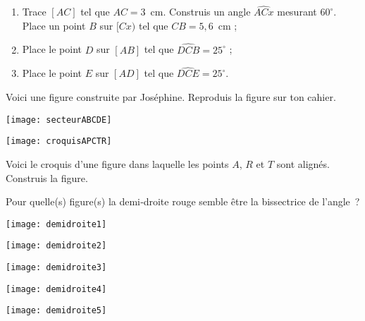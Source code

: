 \begin{exercice}
\begin{enumerate}
\item Trace $[AC]$ tel que $AC = 3$ cm. Construis un angle $\widehat{ACx}$ mesurant $60^\circ$. Place un point $B$ sur $[Cx)$ tel que $CB = 5,6$ cm ;
\item Place le point $D$ sur $[AB]$ tel que $\widehat{DCB} = 25^\circ$ ;
\item Place le point $E$ sur $[AD]$ tel que $\widehat{DCE} = 25^\circ$.
\end{enumerate}
\end{exercice} 


\begin{exercice}
Voici une figure construite par Joséphine. Reproduis la figure sur ton cahier.
 \begin{center} \texttt{[image: secteurABCDE]} \end{center}
\end{exercice} 


\begin{exercice}
 \begin{center} \texttt{[image: croquisAPCTR]} \end{center}
 Voici le croquis d’une figure dans laquelle les points $A$, $R$ et $T$ sont alignés. Construis la figure.
\end{exercice} 


\columnbreak




\begin{exercice}[Reconnaître]
Pour quelle(s) figure(s) la demi‑droite rouge semble être la bissectrice de l'angle ?
\begin{colenumerate}{3}
 \item  
 
 \texttt{[image: demidroite1]}
 \item 
 
 \texttt{[image: demidroite2]}
 \item 
 
 \texttt{[image: demidroite3]}
 \item 
 
 \texttt{[image: demidroite4]}
 \item
 
 \texttt{[image: demidroite5]}

 \end{colenumerate}
\end{exercice} 


